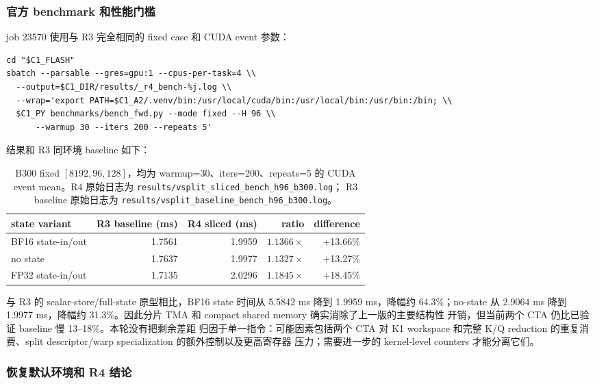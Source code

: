 \documentclass[11pt,a4paper,fontset=none]{ctexart}
\newcommand{\code}[1]{\texttt{#1}}
\begin{document}
\subsubsection{官方 benchmark 和性能门槛}

job 23570 使用与 R3 完全相同的 fixed case 和 CUDA event 参数：

\begin{lstlisting}
cd "$C1_FLASH"
sbatch --parsable --gres=gpu:1 --cpus-per-task=4 \\
  --output=$C1_DIR/results/_r4_bench-%j.log \\
  --wrap='export PATH=$C1_A2/.venv/bin:/usr/local/cuda/bin:/usr/local/bin:/usr/bin:/bin; \\
  $C1_PY benchmarks/bench_fwd.py --mode fixed --H 96 \\
      --warmup 30 --iters 200 --repeats 5'
\end{lstlisting}

结果和 R3 同环境 baseline 如下：

\begin{table}[htbp]
\centering
\small
\begin{tabular}{l r r r r}
\toprule
state variant & R3 baseline (ms) & R4 sliced (ms) & ratio & difference \\
\midrule
BF16 state-in/out & 1.7561 & 1.9959 & \(1.1366\times\) & +13.66\% \\
no state & 1.7637 & 1.9977 & \(1.1327\times\) & +13.27\% \\
FP32 state-in/out & 1.7135 & 2.0296 & \(1.1845\times\) & +18.45\% \\
\bottomrule
\end{tabular}
\caption{B300 fixed \([8192,96,128]\)，均为 warmup=30、iters=200、repeats=5 的
CUDA event mean。R4 原始日志为 \code{results/vsplit\_sliced\_bench\_h96\_b300.log}；
R3 baseline 原始日志为 \code{results/vsplit\_baseline\_bench\_h96\_b300.log}。}
\end{table}

与 R3 的 scalar-store/full-state 原型相比，BF16 state 时间从 5.5842 ms 降到
1.9959 ms，降幅约 64.3\%；no-state 从 2.9064 ms 降到 1.9977 ms，降幅约
31.3\%。因此分片 TMA 和 compact shared memory 确实消除了上一版的主要结构性
开销，但当前两个 CTA 仍比已验证 baseline 慢 13--18\%。本轮没有把剩余差距
归因于单一指令：可能因素包括两个 CTA 对 K1 workspace 和完整 K/Q reduction
的重复消费、split descriptor/warp specialization 的额外控制以及更高寄存器
压力；需要进一步的 kernel-level counters 才能分离它们。

\subsubsection{恢复默认环境和 R4 结论}
\end{document}
